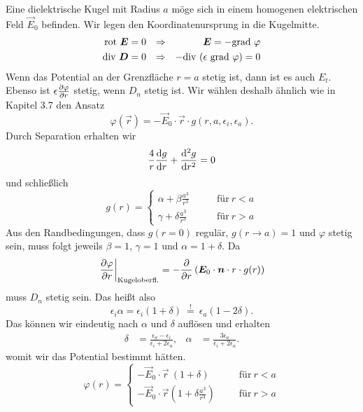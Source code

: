 Eine dielektrische Kugel mit Radius $a$ möge sich in einem homogenen elektrischen Feld $\vec{E}_0$ befinden. Wir legen den Koordinatenursprung in die Kugelmitte. 
\begin{align*}
\rot \vec{E} &=0 &\Rightarrow & &\vec{E}=-\grad\varphi\\
\div\vec{D} &=0 &\Rightarrow& &-\div(\epsilon \ \grad\varphi)=0
\end{align*}
Wenn das Potential an der Grenzfläche $r=a$ stetig ist, dann ist es auch $E_t$. Ebenso ist $\epsilon\frac{\partial{\varphi}}{\partial{r}}$ stetig, wenn $D_n$ stetig ist. Wir wählen deshalb ähnlich wie in Kapitel 3.7 den Ansatz
\begin{equation*}
\varphi(\vec{r})=-\vec{E}_0\cdot\vec{r}\cdot g(r,a,\epsilon_i,\epsilon_a).
\end{equation*}
Durch Separation erhalten wir
\begin{equation*}
\frac{4}{r}\frac{\mathrm{d}{g}}{\mathrm{d}{r}}+\frac{\mathrm{d}^2{g}}{\mathrm{d}{r}^2}=0
\end{equation*}
und schließlich
\begin{equation*}
g(r)=\begin{cases}
\alpha + \beta\frac{a^3}{r^3} \qquad&\text{für}\ r<a\\
\gamma + \delta\frac{a^3}{r^3}\qquad&\text{für}\ r>a
\end{cases}
\end{equation*}
Aus den Randbedingungen, dass $g(r=0)$ regulär, $g(r\rightarrow a)=1$ und $\varphi$ stetig sein, muss folgt jeweils $\beta=1$, $\gamma=1$ und $\alpha=1+\delta$. Da
\begin{equation*}
\left.\frac{\partial{\varphi}}{\partial{r}}\right|_\text{Kugeloberfl.} = -\frac{\partial{}}{\partial{r}}\left(\bm{E}_0\cdot\bm{n}\cdot r\cdot g(r)\right)
\end{equation*}
muss $D_n$ stetig sein. Das heißt also
\begin{equation*}
\epsilon_i \alpha = \epsilon_i(1+\delta)\ \stackrel{!}{=}\ \epsilon_a(1-2\delta).
\end{equation*}
Das können wir eindeutig nach $\alpha$ und $\delta$ auflösen und erhalten
\begin{align*}
\delta & = \frac{\epsilon_a-\epsilon_i}{\epsilon_i+2\epsilon_a}, &\alpha &=\frac{3\epsilon_a}{\epsilon_i+2\epsilon_a}.
\end{align*}
womit wir das Potential bestimmt hätten.
\begin{equation*}
\varphi(r)=\begin{cases}
-\vec{E}_0\cdot\vec{r}\ (1+\delta) \qquad\ &\text{für}\ r<a\\
-\vec{E}_0\cdot\vec{r}  (1+\delta\frac{a^3}{r^3})\quad &\text{für}\ r>a
\end{cases}
\end{equation*}
